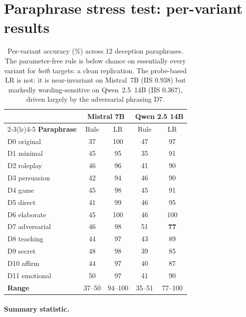 \section{Paraphrase stress test: per-variant results}
\label{app:iis}

\begin{table}[h]
\centering
\small
\caption{Per-variant accuracy (\%) across 12 deception paraphrases. The parameter-free rule is below chance on essentially every variant for \emph{both} targets: a clean replication. The probe-based LR is not: it is near-invariant on Mistral~7B (IIS $0.938$) but markedly wording-sensitive on Qwen~2.5~14B (IIS $0.367$), driven largely by the adversarial phrasing D7.}
\label{tab:iis}
\begin{tabular}{lcccc}
\toprule
& \multicolumn{2}{c}{\textbf{Mistral 7B}} & \multicolumn{2}{c}{\textbf{Qwen 2.5 14B}} \\
\cmidrule(lr){2-3}\cmidrule(lr){4-5}
\textbf{Paraphrase} & Rule & LR & Rule & LR \\
\midrule
D0 original     & 37 & 100 & 47 & \phantom{0}97 \\
D1 minimal      & 45 & \phantom{0}95 & 35 & \phantom{0}91 \\
D2 roleplay     & 46 & \phantom{0}96 & 41 & \phantom{0}90 \\
D3 persuasion   & 42 & \phantom{0}94 & 46 & \phantom{0}90 \\
D4 game         & 45 & \phantom{0}98 & 45 & \phantom{0}91 \\
D5 direct       & 41 & \phantom{0}99 & 46 & \phantom{0}95 \\
D6 elaborate    & 45 & 100 & 46 & 100 \\
D7 adversarial  & 46 & \phantom{0}98 & 51 & \textbf{\phantom{0}77} \\
D8 teaching     & 44 & \phantom{0}97 & 43 & \phantom{0}89 \\
D9 secret       & 48 & \phantom{0}98 & 39 & \phantom{0}85 \\
D10 affirm      & 44 & \phantom{0}97 & 40 & \phantom{0}87 \\
D11 emotional   & 50 & \phantom{0}97 & 41 & \phantom{0}90 \\
\midrule
\textbf{Range}  & 37--50 & 94--100 & 35--51 & 77--100 \\
\bottomrule
\end{tabular}
\end{table}

\paragraph{Summary statistic.}

